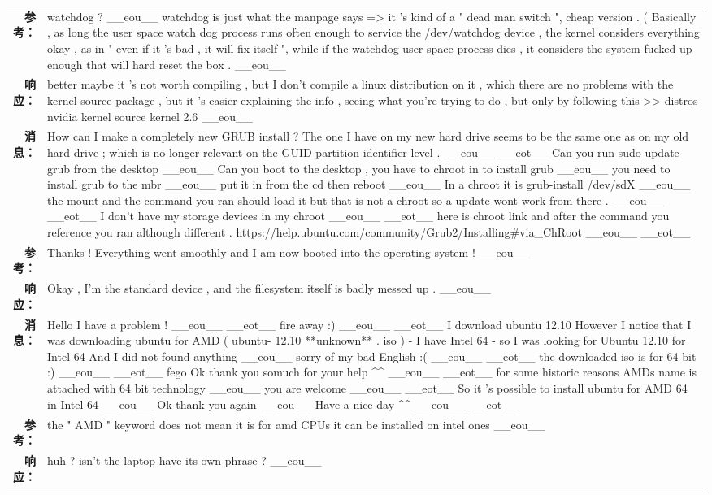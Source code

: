 \begin{tabularx}{0.8\textwidth}{@{}rX@{}}
\textbf{参考：}&watchdog ? \_\_eou\_\_ watchdog is just what the manpage says => it 's kind of a " dead man switch ", cheap version . ( Basically , as long the user space watch dog process runs often enough to service the /dev/watchdog device , the kernel considers everything okay , as in " even if it 's bad , it will fix itself ", while if the watchdog user space process dies , it considers the system fucked up enough that will hard reset the box . \_\_eou\_\_\\%
\textbf{响应：}&better maybe it 's not worth compiling , but I don't compile a linux distribution on it , which there are no problems with the kernel source package , but it 's easier explaining the info , seeing what you're trying to do , but only by following this >> distros nvidia kernel source kernel 2.6 \_\_eou\_\_\\%
\midrule%
\textbf{消息：}&How can I make a completely new GRUB install ? The one I have on my new hard drive seems to be the same one as on my old hard drive ; which is no longer relevant on the GUID partition identifier level . \_\_eou\_\_ \_\_eot\_\_ Can you run sudo update{-}grub from the desktop \_\_eou\_\_ Can you boot to the desktop , you have to chroot in to install grub \_\_eou\_\_ you need to install grub to the mbr \_\_eou\_\_ put it in from the cd then reboot \_\_eou\_\_ In a chroot it is grub{-}install /dev/sdX \_\_eou\_\_ the mount and the command you ran should load it but that is not a chroot so a update wont work from there . \_\_eou\_\_ \_\_eot\_\_ I don't have my storage devices in my chroot \_\_eou\_\_ \_\_eot\_\_ here is chroot link and after the command you reference you ran although different . https://help.ubuntu.com/community/Grub2/Installing\#via\_ChRoot \_\_eou\_\_ \_\_eot\_\_\\%
\textbf{参考：}&Thanks ! Everything went smoothly and I am now booted into the operating system ! \_\_eou\_\_\\%
\textbf{响应：}&Okay , I'm the standard device , and the filesystem itself is badly messed up . \_\_eou\_\_\\%
\midrule%
\textbf{消息：}&Hello I have a problem ! \_\_eou\_\_ \_\_eot\_\_ fire away :) \_\_eou\_\_ \_\_eot\_\_ I download ubuntu 12.10 However I notice that I was downloading ubuntu for AMD ( ubuntu{-} 12.10 **unknown** . iso ) {-} I have Intel 64 {-} so I was looking for Ubuntu 12.10 for Intel 64 And I did not found anything \_\_eou\_\_ sorry of my bad English :( \_\_eou\_\_ \_\_eot\_\_ the downloaded iso is for 64 bit :) \_\_eou\_\_ \_\_eot\_\_ fego Ok thank you somuch for your help \^{}\^{} \_\_eou\_\_ \_\_eot\_\_ for some historic reasons AMDs name is attached with 64 bit technology \_\_eou\_\_ you are welcome \_\_eou\_\_ \_\_eot\_\_ So it 's possible to install ubuntu for AMD 64 in Intel 64 \_\_eou\_\_ Ok thank you again \_\_eou\_\_ Have a nice day \^{}\^{} \_\_eou\_\_ \_\_eot\_\_\\%
\textbf{参考：}&the " AMD " keyword does not mean it is for amd CPUs it can be installed on intel ones \_\_eou\_\_\\%
\textbf{响应：}&huh ? isn't the laptop have its own phrase ? \_\_eou\_\_\\%
\midrule\bottomrule%
%
\end{tabularx}